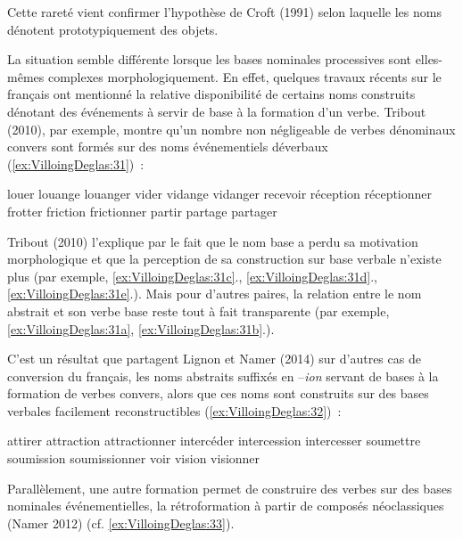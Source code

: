 \documentclass[output=paper]{langsci/langscibook}
\begin{document}
Cette rareté vient confirmer l'hypothèse de Croft (1991) selon laquelle
les noms dénotent prototypiquement des objets.

La situation semble différente lorsque les bases nominales processives
sont elles-mêmes complexes morphologiquement. En effet, quelques travaux
récents sur le français ont mentionné la relative disponibilité de
certains noms construits dénotant des événements à servir de base à la
formation d'un verbe. Tribout (2010), par exemple, montre qu'un nombre
non négligeable de verbes dénominaux convers sont formés sur des noms
événementiels déverbaux (\ref{ex:VilloingDeglas:31})~:

\ea \label{ex:VilloingDeglas:31}
  \ea\label{ex:VilloingDeglas:31a} louer \textrightarrow{} louange \textrightarrow{} louanger
  \ex\label{ex:VilloingDeglas:31b} vider \textrightarrow{} vidange \textrightarrow{} vidanger
  \ex\label{ex:VilloingDeglas:31c} recevoir \textrightarrow{} réception \textrightarrow{} réceptionner
  \ex\label{ex:VilloingDeglas:31d} frotter \textrightarrow{} friction \textrightarrow{} frictionner
  \ex\label{ex:VilloingDeglas:31e} partir \textrightarrow{} partage \textrightarrow{} partager
\z\z

Tribout (2010) l'explique par le fait que le nom base a perdu sa
motivation morphologique et que la perception de sa construction sur
base verbale n'existe plus (par exemple, \ref{ex:VilloingDeglas:31c}., \ref{ex:VilloingDeglas:31d}., \ref{ex:VilloingDeglas:31e}.). Mais pour
d'autres paires, la relation entre le nom abstrait et son verbe base
reste tout à fait transparente (par exemple, \ref{ex:VilloingDeglas:31a}, \ref{ex:VilloingDeglas:31b}.).

C'est un résultat que partagent Lignon et Namer (2014) sur d'autres cas
de conversion du français, les noms abstraits suffixés en --\emph{ion}
servant de bases à la formation de verbes convers, alors que ces noms
sont construits sur des bases verbales facilement reconstructibles
(\ref{ex:VilloingDeglas:32})~:

\ea \label{ex:VilloingDeglas:32}
\ea attirer \textrightarrow{} attraction \textrightarrow{} attractionner
\ex  intercéder \textrightarrow{} intercession \textrightarrow{} intercesser
\ex  soumettre \textrightarrow{} soumission \textrightarrow{} soumissionner
\ex  voir \textrightarrow{} vision \textrightarrow{} visionner
\z\z

Parallèlement, une autre formation permet de construire des verbes sur
des bases nominales événementielles, la rétroformation à partir de
composés néoclassiques (Namer 2012) (cf. \ref{ex:VilloingDeglas:33}).
\end{document}
